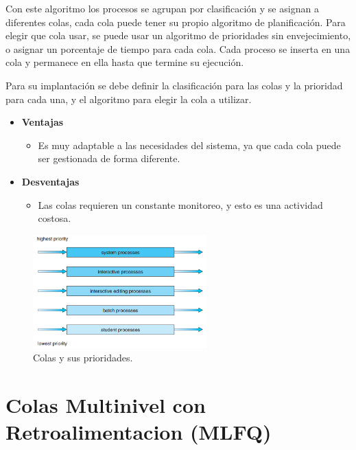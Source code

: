 \documentclass{article}
\begin{document}
Con este algoritmo los procesos se agrupan por clasificación y se asignan a diferentes colas,
cada cola puede tener su propio algoritmo de planificación. Para elegir que cola usar,
se puede usar un algoritmo de prioridades sin envejecimiento, o asignar un porcentaje
de tiempo para cada cola.
Cada proceso se inserta en una cola y permanece en ella hasta que termine su ejecución.

Para su implantación se debe definir la clasificación para las colas y la prioridad para cada una,
y el algoritmo para elegir la cola a utilizar.
\begin{itemize}
	\item \textbf{Ventajas}
	\begin{itemize}
		\item Es muy adaptable a las necesidades del sistema, ya que cada cola puede ser gestionada de
		forma diferente.
	\end{itemize}
	
	\item \textbf{Desventajas}
	\begin{itemize}
		\item Las colas requieren un constante monitoreo, y esto es una actividad costosa.
	\end{itemize}
\end{itemize}

\vspace{0.1cm}
\begin{figure}[h]
	\centering
	\includegraphics[width=0.6\textwidth]{img/mlq}
	\caption{\label{img:mlq}Colas y sus prioridades.}
\end{figure}
\newpage


{\centering \section{Colas Multinivel con Retroalimentacion (MLFQ)}}
\end{document}
